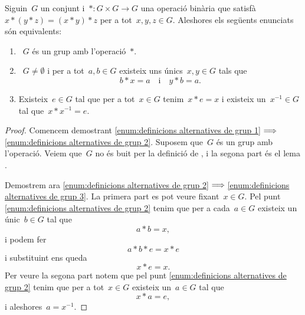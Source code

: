 \documentclass[../../main.tex]{subfiles}
\begin{document}
    \begin{theorem}
        \label{thm:definicions alternatives de grup}
        Siguin~\(G\) un conjunt i~\(\ast\colon G\times G\to G\) una operació binària que satisfà
        \(x\ast(y\ast z)=(x\ast y)\ast z\) per a tot~\(x,y,z\in G\).
        Aleshores els següents enunciats són equivalents:
        \begin{enumerate}
            \item\label{enum:definicions alternatives de grup 1}~\(G\) és un grup amb l'operació~\(\ast\).
            \item\label{enum:definicions alternatives de grup 2}~\(G\neq\emptyset\) i per a tot~\(a,b\in G\) existeix uns únics~\(x,y\in G\) tals que
            \[
                b\ast x=a\quad\text{i}\quad y\ast b=a.
            \]
            \item\label{enum:definicions alternatives de grup 3} Existeix~\(e\in G\) tal que per a tot~\(x\in G\) tenim~\(x\ast e=x\) i existeix un~\(x^{-1}\in G\) tal que~\(x\ast x^{-1}=e\).
        \end{enumerate}
        \begin{proof}
            Comencem demostrant \eqref{enum:definicions alternatives de grup 1}\(\implies\)\eqref{enum:definicions alternatives de grup 2}.
            Suposem que~\(G\) és un grup amb l'operació.
            Veiem que~\(G\) no és buit per la definició de , i la segona part és el lema .

            Demostrem ara \eqref{enum:definicions alternatives de grup 2}\(\implies\)\eqref{enum:definicions alternatives de grup 3}.
            La primera part es pot veure fixant~\(x\in G\).
            Pel punt \eqref{enum:definicions alternatives de grup 2} tenim que per a cada~\(a\in G\) existeix un únic~\(b\in G\) tal que
            \[
                a\ast b=x,
            \]
            i podem fer
            \[
                a\ast b\ast e=x\ast e
            \]
            i substituint ens queda
            \[
                x\ast e=x.
            \]
            Per veure la segona part notem que pel punt \eqref{enum:definicions alternatives de grup 2} tenim que per a tot~\(x\in G\) existeix un~\(a\in G\) tal que
            \[
                x\ast a=e,
            \]
            i aleshores~\(a=x^{-1}\).


\end{proof}
\end{theorem}
\end{document}
